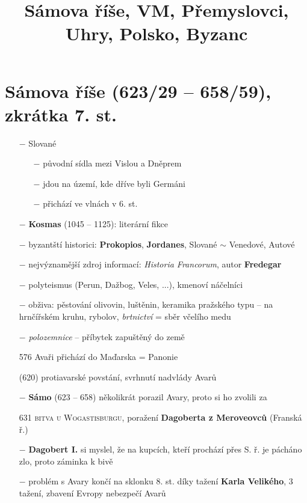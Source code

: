 \documentclass{article}
\title{\vspace{-2cm}Sámova říše, VM, Přemyslovci, Uhry, Polsko, Byzanc\vspace{-1.7cm}}
\date{}
\author{}
\begin{document}
\maketitle

\section*{Sámova říše (623/29 -- 658/59), zkrátka 7. st.}
\begin{itemize}
    \vspace{-0.5em}
    \setlength\itemsep{0.15em}
    \item[$-$] Slované
    \begin{itemize}
        \vspace{-0.5em}
        \setlength\itemsep{0.15em}
        \item[$-$] původní sídla mezi Vislou a Dněprem
        \item[$-$] jdou na území, kde dříve byli Germáni
        \item[$-$] přichází ve vlnách v 6. st.
    \end{itemize}
    \item[$-$] \textbf{Kosmas} (1045 -- 1125): literární fikce
    \item[$-$] byzantští historici: \textbf{Prokopios}, \textbf{Jordanes}, Slované $\sim$ Venedové, Autové
    \item[$-$] nejvýznamější zdroj informací: \textit{Historia Francorum}, autor \textbf{Fredegar}
    \item[$-$] polyteismus (Perun, Dažbog, Veles, ...), kmenoví náčelníci
    \item[$-$] obživa: pěstování olivovin, luštěnin, keramika pražského typu -- na hrnčířském kruhu, rybolov, \textit{brtnictví} = sběr včelího medu
    \item[$-$] \textit{polozemnice} -- příbytek zapuštěný do země
    \item[576] Avaři přichází do Maďarska = Panonie
    \item[(620)] protiavarské povstání, svrhnutí nadvlády Avarů
    \item[$-$] \textbf{Sámo} (623 -- 658) několikrát porazil Avary, proto si ho zvolili za 
    \item[631] \textsc{bitva u Wogastisburgu}, poražení \textbf{Dagoberta z Meroveovců} (Franská ř.)
    \item[$-$] \textbf{Dagobert I.} si myslel, že na kupcích, kteří prochází přes S. ř. je pácháno zlo, proto záminka k bivě
    \item[$-$] problém s Avary končí na sklonku 8. st. díky tažení \textbf{Karla Velikého}, 3 tažení, zbavení Evropy nebezpečí Avarů
\end{itemize}
\end{document}
